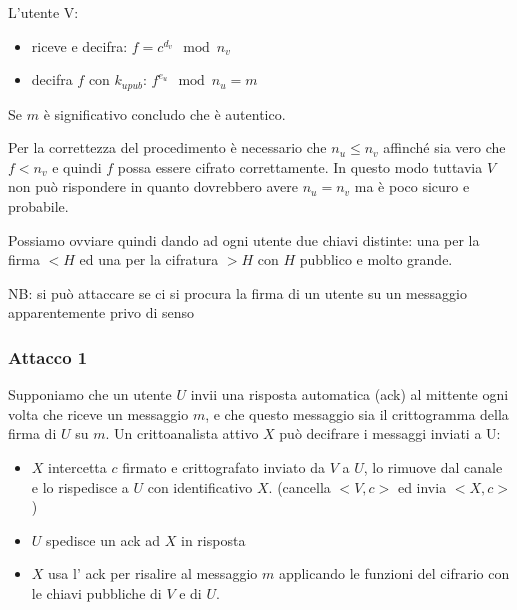 L'utente V:
\begin{itemize}
    \item riceve e decifra: $f = c^{d_v} \mod n_v$
    \item decifra $f$ con $k_{upub}$: $f^{e_u} \mod n_u = m$
\end{itemize}

Se $m$ è significativo concludo che è autentico.

Per la correttezza del procedimento è necessario che $n_u \leq n_v$ affinché sia vero che $f < n_v$ e quindi $f$ possa essere cifrato correttamente.
In questo modo tuttavia $V$ non può rispondere in quanto dovrebbero avere $n_u = n_v$ ma è poco sicuro e probabile.

Possiamo ovviare quindi dando ad ogni utente due chiavi distinte: una per la firma $< H$ ed una per la cifratura $> H$ con $H$ pubblico e molto grande.

NB: si può attaccare se ci si procura la firma di un utente su un messaggio apparentemente privo di senso

\subsubsection{Attacco 1}
Supponiamo che un utente $U$ invii una risposta automatica (ack) al mittente ogni volta che riceve un messaggio $m$, e che questo messaggio sia il crittogramma della firma di $U$ su $m$.
Un crittoanalista attivo $X$ può decifrare i messaggi inviati a U:
\begin{itemize}
    \item $X$ intercetta $c$ firmato e crittografato inviato da $V$ a $U$, lo rimuove dal canale e lo rispedisce a $U$ con identificativo $X$. (cancella $<V,c>$ ed invia $<X,c>$)
    \item $U$ spedisce un ack ad $X$ in risposta
    \item $X$ usa l' ack per risalire al messaggio $m$ applicando le funzioni del cifrario con le chiavi pubbliche di $V$ e di $U$.
\end{itemize}

